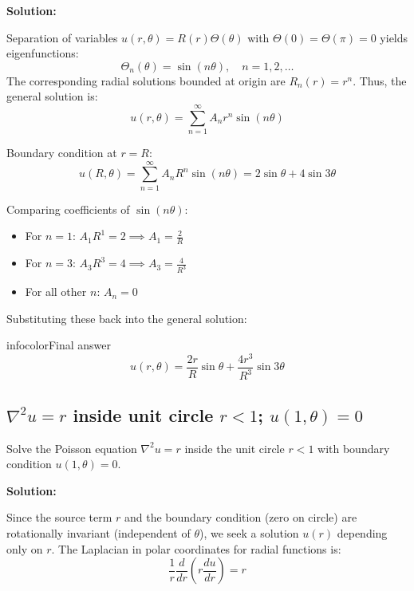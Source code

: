 \documentclass[a4paper,11pt]{article} %
\newenvironment{summarybox}[1][]{\begin{custombox}[#1]{infocolor}{Final answer}}{\end{custombox}}
\begin{document}
\textbf{Solution:}

Separation of variables $u(r,\theta) = R(r)\Theta(\theta)$ with $\Theta(0)=\Theta(\pi)=0$ yields eigenfunctions:
$$ \Theta_n(\theta) = \sin(n\theta), \quad n=1,2,\dots $$
The corresponding radial solutions bounded at origin are $R_n(r) = r^n$.
Thus, the general solution is:
$$ u(r,\theta) = \sum_{n=1}^{\infty} A_n r^n \sin(n\theta) $$

Boundary condition at $r=R$:
$$ u(R,\theta) = \sum_{n=1}^{\infty} A_n R^n \sin(n\theta) = 2\sin\theta + 4\sin 3\theta $$

Comparing coefficients of $\sin(n\theta)$:
\begin{itemize}
    \item For $n=1$: $A_1 R^1 = 2 \implies A_1 = \frac{2}{R}$
    \item For $n=3$: $A_3 R^3 = 4 \implies A_3 = \frac{4}{R^3}$
    \item For all other $n$: $A_n = 0$
\end{itemize}

Substituting these back into the general solution:

\begin{summarybox}
$$ u(r, \theta) = \frac{2r}{R}\sin\theta + \frac{4r^3}{R^3}\sin 3\theta $$
\end{summarybox}

\newpage

\subsection{\texorpdfstring{$\nabla^2 u = r$ inside unit circle $r<1$; $u(1,\theta)=0$}{Poisson with radial source: radially symmetric ODE, regularity at origin forces $C_1=0$}}

\begin{problembox}
Solve the Poisson equation $\nabla^2 u = r$ inside the unit circle $r < 1$ with boundary condition $u(1, \theta) = 0$.
\end{problembox}

\textbf{Solution:}

Since the source term $r$ and the boundary condition (zero on circle) are rotationally invariant (independent of $\theta$), we seek a solution $u(r)$ depending only on $r$.
The Laplacian in polar coordinates for radial functions is:
$$ \frac{1}{r} \frac{d}{dr}\left(r \frac{du}{dr}\right) = r $$
\end{document}
